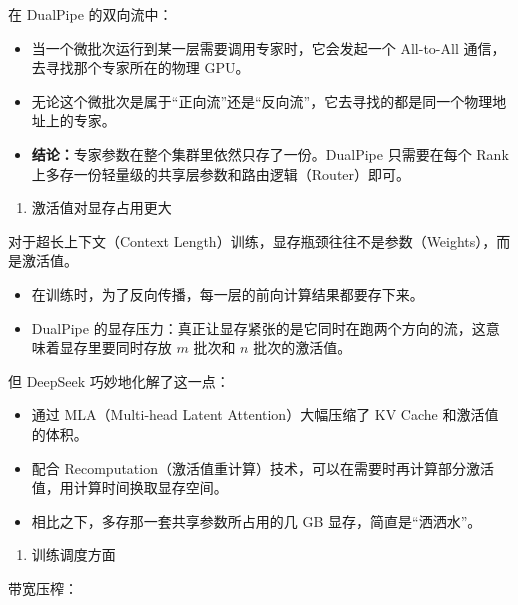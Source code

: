 在 DualPipe 的双向流中：

\begin{itemize}
\tightlist
\item
  当一个微批次运行到某一层需要调用专家时，它会发起一个 All-to-All 通信，去寻找那个专家所在的物理 GPU。
\item
  无论这个微批次是属于``正向流''还是``反向流''，它去寻找的都是同一个物理地址上的专家。
\item
  \textbf{结论：}专家参数在整个集群里依然只存了一份。DualPipe 只需要在每个 Rank 上多存一份轻量级的共享层参数和路由逻辑（Router）即可。
\end{itemize}

\begin{enumerate}
\def\labelenumi{\arabic{enumi}.}
\setcounter{enumi}{1}
\tightlist
\item
  激活值对显存占用更大
\end{enumerate}

对于超长上下文（Context Length）训练，显存瓶颈往往不是参数（Weights），而是激活值。

\begin{itemize}
\tightlist
\item
  在训练时，为了反向传播，每一层的前向计算结果都要存下来。
\item
  DualPipe 的显存压力：真正让显存紧张的是它同时在跑两个方向的流，这意味着显存里要同时存放 \(m\) 批次和 \(n\) 批次的激活值。
\end{itemize}

但 DeepSeek 巧妙地化解了这一点：

\begin{itemize}
\tightlist
\item
  通过 MLA（Multi-head Latent Attention）大幅压缩了 KV Cache 和激活值的体积。
\item
  配合 Recomputation（激活值重计算）技术，可以在需要时再计算部分激活值，用计算时间换取显存空间。
\item
  相比之下，多存那一套共享参数所占用的几 GB 显存，简直是``洒洒水''。
\end{itemize}

\begin{enumerate}
\def\labelenumi{\arabic{enumi}.}
\setcounter{enumi}{2}
\tightlist
\item
  训练调度方面
\end{enumerate}

带宽压榨：

